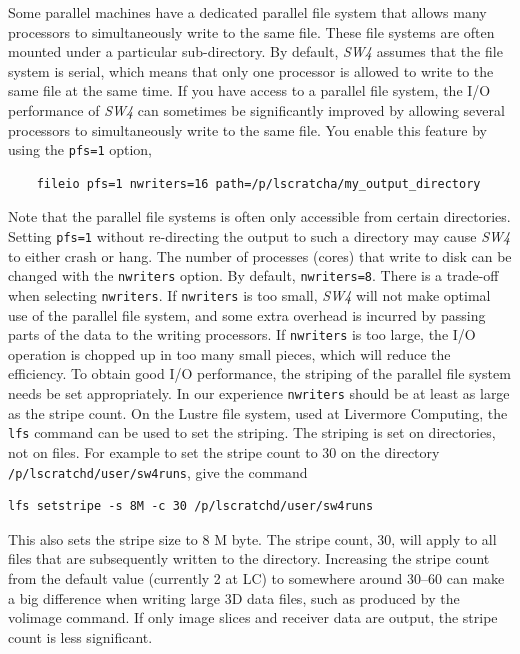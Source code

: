 \documentclass[11pt]{report}
\begin{document}
{Some parallel machines have a dedicated parallel file system that allows many processors to
simultaneously write to the same file. These file systems are often mounted under a particular
sub-directory. By default, \emph{SW4} assumes that the file system is serial, which means that only
one processor is allowed to write to the same file at the same time. If you have access to a
parallel file system, the I/O performance of \emph{SW4} can sometimes be significantly improved by allowing
several processors to simultaneously write to the same file. You enable this feature by using the {\tt pfs=1}
option,
\begin{verbatim}
	fileio pfs=1 nwriters=16 path=/p/lscratcha/my_output_directory
\end{verbatim}
Note that the parallel file systems is often only accessible from certain
directories. Setting \verb+pfs=1+ without re-directing the output to such a directory may cause
\emph{SW4} to either crash or hang.
The number of processes (cores) that write to disk can be changed with the \verb+nwriters+
option. By default, \verb+nwriters=8+. There is a trade-off when selecting \verb+nwriters+.
If \verb+nwriters+  is too small, \emph{SW4} will not make optimal use of the parallel file system, and some
extra overhead is incurred by passing parts of the data to the writing processors. If \verb+nwriters+ is
too large, the I/O operation is chopped up in too many small pieces, which will reduce the efficiency.
To obtain good I/O performance, the striping of the parallel file system needs be set appropriately. In our experience
\verb+nwriters+ should be at least as large as the stripe count. On the Lustre file system, used at Livermore Computing,
the \verb+lfs+ command can be used to set the striping. The striping is set on directories, not on files.
For example to set the stripe count to 30 on the directory \verb+/p/lscratchd/user/sw4runs+, give the command
\begin{verbatim}
lfs setstripe -s 8M -c 30 /p/lscratchd/user/sw4runs
\end{verbatim}
This also sets the stripe size to 8 M byte. The stripe count, 30, will apply to all files that are subsequently
written to the directory. Increasing the stripe count from the default value (currently 2 at LC)
to somewhere around 30--60 can make a big difference when writing large 3D data files,
such as produced by the volimage command. If only image slices and receiver data are output, the stripe count
is less significant.



}
\end{document}

